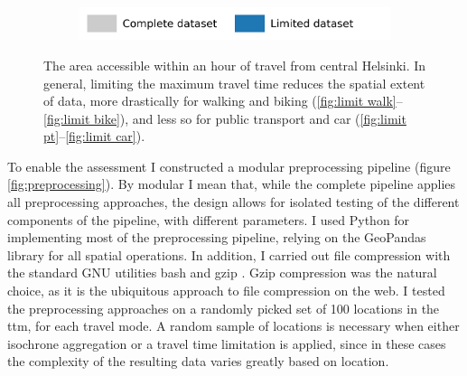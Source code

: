 \begin{figure}[H]
	\hfill
	\begin{subfigure}[b]{0.55\textwidth}
		\includegraphics[width=\textwidth]{visual/figures/ttm/tt_limit_legend}
	\end{subfigure}%
	\caption{
		The area accessible within an hour of travel from central Helsinki.
		In general, limiting the maximum travel time reduces the spatial extent of data,
		more drastically for walking and biking (\ref{fig:limit walk}--\ref{fig:limit bike}),
		and less so for public transport and car (\ref{fig:limit pt}--\ref{fig:limit car}).
	}
	\label{fig:tt limits}
\end{figure}

To enable the assessment
I constructed a modular preprocessing pipeline
(figure \ref{fig:preprocessing}).
By modular I mean that,
while the complete pipeline applies all preprocessing approaches,
the design allows for isolated testing of the
different components of the pipeline, with different parameters.
I used Python for implementing most of the preprocessing pipeline,
relying on the GeoPandas \parencite{jor2024} library for all spatial operations.
In addition, I carried out file compression with
the standard GNU utilities bash \parencite{bash} and gzip \parencite{gzip}.
Gzip compression was the natural choice,
as it is the ubiquitous approach to file compression on the web. 
I tested the preprocessing approaches on
a randomly picked set of 100 locations in the \acrshort{ttm},
for each travel mode.
A random sample of locations is necessary when either
isochrone aggregation or a travel time limitation is applied,
since in these cases the complexity of the resulting
data varies greatly based on location.

